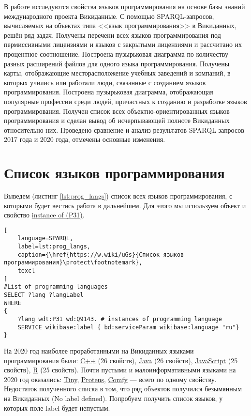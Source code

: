 В работе исследуются свойства языков программирования на основе базы знаний международного проекта Викиданные. С помощью SPARQL-запросов, вычисляемых на объектах типа <<язык программирования>>  в Викиданных, решён ряд задач. Получены перечени всех языков программирования под пермиссивными лицензиями и языков с закрытыми лицензиями и рассчитано их процентное соотношение. Построена пузырьковая диаграмма по количеству разных расширений файлов для одного языка программирования. Получены карты, отображающие месторасположение учебных заведений и компаний, в которых учились или работали люди, связанные с созданием языков программирования. Построена пузырьковая диаграмма, отображающая популярные профессии среди людей, причастных к созданию и разработке языков программирования. Получен список всех объектно-ориентированных языков программирования и сделан вывод об исчерпывающей полноте Викиданных относительно них. Проведено сравнение и анализ результатов SPARQL-запросов 2017 года и 2020 года, отмечены основные изменения. 

\section{Список языков программирования}
Выведем (листинг \ref{lst:prog_langs}) список всех языков программирования, с которыми будет вестись работа в дальнейшем. Для этого мы используем объект  и свойство \href{https://www.wikidata.org/wiki/Property:P31}{instance of (P31)}.

\begin{lstlisting}[
	language=SPARQL,
	label=lst:prog_langs,
	caption={\href{https://w.wiki/uGs}{Список языков программирования}\protect\footnotemark},
	texcl 
]
#List of programming languages
SELECT ?lang ?langLabel
WHERE
{
    ?lang wdt:P31 wd:Q9143. # instances of programming language
    SERVICE wikibase:label { bd:serviceParam wikibase:language "ru"}
}
\end{lstlisting}

На 2020 год наиболее проработанными на Викиданных языками программирования были: \href{https://www.wikidata.org/wiki/Q2407}{C++} (26 свойств), \href{https://www.wikidata.org/wiki/Q251}{Java} (26 свойств), \href{https://www.wikidata.org/wiki/Q2005}{JavaScript} (25 свойств), \href{https://www.wikidata.org/wiki/Q206904}{R} (25 свойств).
Почти пустыми и малоинформативными языками на 2020 год оказались\autocite{prowd_langs_link}: \href{https://www.wikidata.org/wiki/Q3991643}{Tiny}, \href{https://www.wikidata.org/wiki/Q3924253}{Proteus}, \href{https://www.wikidata.org/wiki/Q21524853}{Comfy} --- всего по одному свойству.
Недостаток полученного списка в том, что ряд объектов получился безымянным на Викиданных (No label defined). Попробуем получить список языков, у которых поле label  будет непустым.

